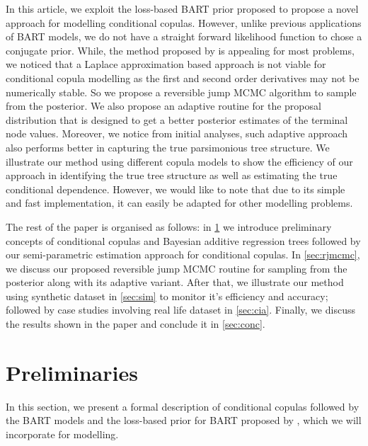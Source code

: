 \documentclass{amsart}
\begin{document}
In this article, we exploit the loss-based BART prior proposed \citet{serafini2024lossbasedpriortreetopologies} to propose a novel approach for modelling conditional copulas. However, unlike previous applications of BART models, we do not have a straight forward likelihood function to chose a conjugate prior. While, the method proposed by \citet{Linero02012025} is appealing for most problems, we noticed that a Laplace approximation based approach is not
viable for conditional copula modelling as the first and second order derivatives may not be numerically stable. So we propose a reversible jump MCMC algorithm to sample from the posterior. We also propose an adaptive routine for the proposal distribution that is designed to get a better posterior estimates of the terminal node values. Moreover, we notice from initial analyses, such adaptive approach also performs better in capturing the true parsimonious tree structure. We illustrate our method using different copula models to show the efficiency of our approach in identifying the true tree structure as well as estimating the true conditional dependence. However, we would like to note that due to its simple and fast implementation, it can easily be adapted for other modelling problems. 

The rest of the paper is organised as follows: in \cref{sec:prelim} we introduce preliminary concepts of conditional copulas and Bayesian additive regression trees followed by our semi-parametric estimation approach for conditional copulas. In \cref{sec:rjmcmc}, we discuss our proposed reversible jump MCMC routine for sampling from the posterior along with its adaptive variant. After that, we illustrate our method using synthetic dataset in \cref{sec:sim} to monitor it's efficiency and accuracy; followed by case studies involving real life dataset in \cref{sec:cia}. Finally, we discuss the results shown in the paper and conclude it in \cref{sec:conc}.

\section{Preliminaries}\label{sec:prelim}

In this section, we present a formal description of conditional copulas followed by the BART models and the loss-based prior for BART proposed by \citet{serafini2024lossbasedpriortreetopologies}, which we will incorporate for modelling.
\end{document}
